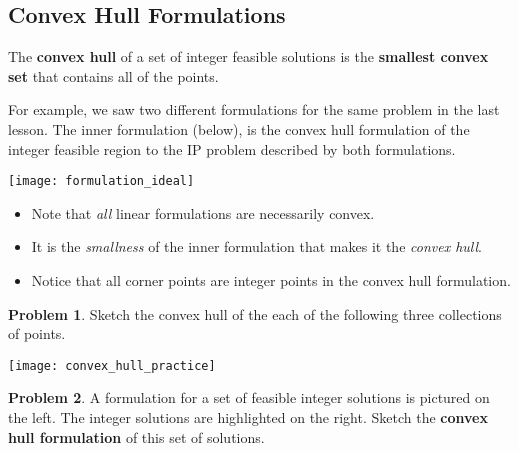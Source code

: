 \documentclass[11pt]{article}
\theoremstyle{definition}
\newtheorem{problem}{Problem}
\newcommand{\answerbox}[3]{%
  \fbox{%
    \begin{minipage}[#1]{#2}
      \hfill\vspace{#3}
    \end{minipage}
  }
}
\newcommand{\answerboxfull}[2]{%
  \answerbox{#1}{6.38in}{#2} 
}
\begin{document}
\answerboxfull{c}{.5in}



\subsection{Convex Hull Formulations}

\begin{tcolorbox}
The \textbf{convex hull} of a set of integer feasible solutions is the \textbf{smallest convex set} that contains all of the points. 
\end{tcolorbox}

For example, we saw two different formulations for the same problem in the last lesson.  The inner formulation (below), is the convex hull formulation of the integer feasible region to the IP problem described by both formulations.  

\begin{minipage}{0.4\textwidth}
\texttt{[image: formulation\_ideal]}
\end{minipage}
\begin{minipage}{0.6\textwidth}
\begin{itemize}
\item Note that \emph{all} linear formulations are necessarily convex.
\item It is the \emph{smallness} of the inner formulation that makes it the \emph{convex hull}. 
\item Notice that all corner points are integer points in the convex hull formulation.
\end{itemize}
\end{minipage}

\bigskip
\begin{problem}
Sketch the convex hull of the each of the following three collections of points.

\texttt{[image: convex\_hull\_practice]}
\end{problem}

\bigskip

\begin{problem} A formulation for a set of feasible integer solutions is pictured on the left.  The integer solutions are highlighted on the right.  Sketch the \textbf{convex hull formulation} of this set of solutions.

\vspace{0.5cm}
\begin{center}
\begin{minipage}{6.5in}
\centering
{}
\hspace*{0.2in}
\end{minipage}
\end{center}
\end{problem}
\end{document}
